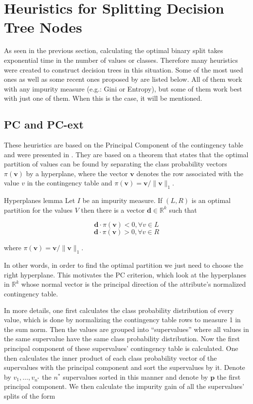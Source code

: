 \section{Heuristics for Splitting Decision Tree Nodes}
\label{sec:heuristics}
As seen in the previous section, calculating the optimal binary split takes exponential time in the number of values or classes. Therefore many heuristics were created to construct decision trees in this situation. Some of the most used ones as well as 
some recent ones proposed by \cite{icml2018} are listed below. All of them work with any impurity measure (e.g.: Gini or Entropy), but some of them work best with just one of them. When this is the case, it will be mentioned.

\subsection{PC and PC-ext}
These heuristics are based on the Principal Component of the contingency table and were presented in \cite{journals/datamine/CoppersmithHH99}. They are based on a theorem that states that the optimal partition of values can be found by separating the class probability vectors $\pi(\mathbf{v})$ by a hyperplane, where the vector $\mathbf{v}$ denotes the row associated with the value $v$ in the contingency table and $\pi(\mathbf{v}) = \mathbf{v} / \lVert \mathbf{v} \rVert_1$.

\begin{theorem}{Hyperplanes lemma}
 Let $I$ be an impurity measure. If $(L, R)$ is an optimal partition for the values $V$ then there is a vector $\mathbf{d} \in \mathbb{R}^k$ such that
 
 $$\mathbf{d} \cdot \pi(\mathbf{v}) < 0, \forall v \in L$$
 $$\mathbf{d} \cdot \pi(\mathbf{v}) > 0, \forall v \in R$$
 
 where $\pi(\mathbf{v}) = \mathbf{v} / \lVert \mathbf{v} \rVert_1$.
\end{theorem}


In other words, in order to find the optimal partition we just need to choose the right hyperplane. This motivates the PC criterion, which look at the hyperplanes in $\mathbb{R}^k$ whose normal vector is the principal direction of the attribute's normalized contingency table.

In more details, one first calculates the class probability distribution of every value, which is done by normalizing the contingency table rows to measure 1 in the sum norm. Then the values are grouped into ``supervalues'' where all values in the same supervalue have the same class probability distribution. Now the first principal component of these supervalues' contingency table is calculated. One then calculates the inner product of each class probability vector of the supervalues  with the principal component and sort the supervalues by it. Denote by $v_1,\ldots,v_{n^*}$ the $n^*$ supervalues sorted in this manner and denote by $\mathbf{p}$ the first principal component. We then calculate the impurity gain of all the supervalues' splits of the form

